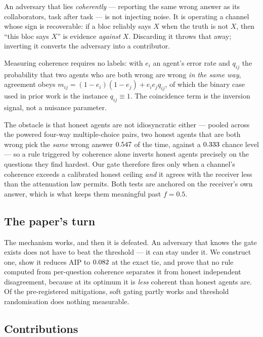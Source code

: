 An adversary that lies \emph{coherently} --- reporting the same wrong answer as
its collaborators, task after task --- is not injecting noise. It is operating a
channel whose sign is recoverable: if a bloc reliably says $X$ when the truth is
not $X$, then ``this bloc says $X$'' is evidence \emph{against} $X$. Discarding
it throws that away; inverting it converts the adversary into a contributor.

Measuring coherence requires no labels: with $e_i$ an agent's error rate and
$q_{ij}$ the probability that two agents who are both wrong are wrong \emph{in
the same way}, agreement obeys $m_{ij} = (1-e_i)(1-e_j) + e_i e_j q_{ij}$, of
which the binary case used in prior work is the instance $q_{ij}\equiv1$. The
coincidence term is the inversion signal, not a nuisance parameter.

The obstacle is that honest agents are not idiosyncratic either --- pooled
across the powered four-way multiple-choice pairs, two honest agents that are both
wrong pick the \emph{same} wrong answer $0.547$ of the time, against a
$0.333$ chance level --- so a rule triggered by coherence alone inverts
honest agents precisely on the questions they find hardest. Our gate therefore
fires only when a channel's coherence exceeds a calibrated honest ceiling
\emph{and} it agrees with the receiver less than the attenuation law permits.
Both tests are anchored on the receiver's own answer, which is what keeps them
meaningful past $f=0.5$.

\subsection{The paper's turn}

The mechanism works, and then it is defeated. An adversary that knows the gate
exists does not have to beat the threshold --- it can stay under it. We construct
one, show it reduces AIP to $0.082$ at the exact tie, and prove
that no rule computed from per-question coherence separates it from honest
independent disagreement, because at its optimum it is \emph{less} coherent than
honest agents are. Of the pre-registered mitigations, soft gating partly works
and threshold randomisation does nothing measurable.

\subsection{Contributions}

